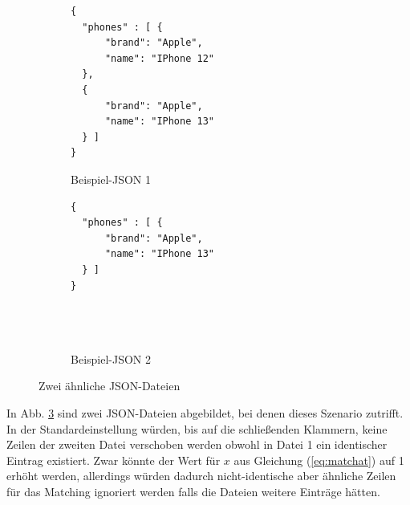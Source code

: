 \begin{figure}
\centering
\begin{subfigure}{.45\textwidth}
  \begin{verbatim}
{
  "phones" : [ {
	  "brand": "Apple",
	  "name": "IPhone 12"
  },
  {
      "brand": "Apple",
	  "name": "IPhone 13"
  } ]
}
  \end{verbatim}
  \caption{Beispiel-JSON 1}
  \label{fig:sub1}
\end{subfigure}
\begin{subfigure}{.45\textwidth}
\begin{verbatim}
{
  "phones" : [ {
	  "brand": "Apple",
	  "name": "IPhone 13"
  } ]
}




\end{verbatim}
  \caption{Beispiel-JSON 2}
  \label{fig:sub2}
\end{subfigure}
\caption{Zwei ähnliche JSON-Dateien}
\label{fig:bestMatchJSON}
\end{figure}

In Abb. \ref{fig:bestMatchJSON} sind zwei JSON-Dateien abgebildet, bei denen dieses Szenario zutrifft. In der Standardeinstellung würden, bis auf die schließenden Klammern, keine Zeilen der zweiten Datei verschoben werden obwohl in Datei 1 ein identischer Eintrag existiert. Zwar könnte der Wert für $x$ aus Gleichung (\ref{eq:matchat}) auf 1 erhöht werden, allerdings würden dadurch nicht-identische aber ähnliche Zeilen für das Matching ignoriert werden falls die Dateien weitere Einträge hätten.

